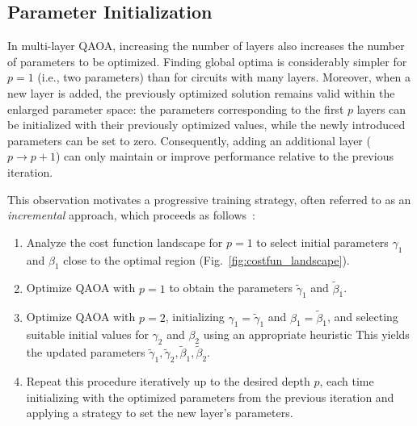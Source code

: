 \subsection{Parameter Initialization}
\label{Section:IncrementalApproach}

In multi-layer QAOA, increasing the number of layers also increases the number of parameters to be optimized. Finding global optima is considerably simpler for $p=1$ (i.e., two parameters) than for circuits with many layers. Moreover, when a new layer is added, the previously optimized solution remains valid within the enlarged parameter space: the parameters corresponding to the first $p$ layers can be initialized with their previously optimized values, while the newly introduced parameters can be set to zero. Consequently, adding an additional layer ($p \rightarrow p+1$) can only maintain or improve performance relative to the previous iteration.

This observation motivates a progressive training strategy, often referred to as an \emph{incremental} approach, which proceeds as follows~\cite{zhou_quantum_2020}:
\begin{enumerate}
    \item Analyze the cost function landscape for $p=1$ to select initial parameters $\gamma_1$ and $\beta_1$ close to the optimal region (Fig.~\ref{fig:costfun_landscape}).
    \item Optimize QAOA with $p=1$ to obtain the parameters $\widetilde{\gamma}_1$ and $\widetilde{\beta}_1$.
    \item Optimize QAOA with $p=2$, initializing $\gamma_1=\widetilde{\gamma}_1$ and $\beta_1=\widetilde{\beta}_1$, and selecting suitable initial values for $\gamma_2$ and $\beta_2$ using an appropriate heuristic This yields the updated parameters $\widetilde{\gamma}_1, \widetilde{\gamma}_2, \widetilde{\beta}_1, \widetilde{\beta}_2$.
    \item Repeat this procedure iteratively up to the desired depth $p$, each time initializing
    with the optimized parameters from the previous iteration and applying a strategy to set
    the new layer's parameters.
\end{enumerate}

